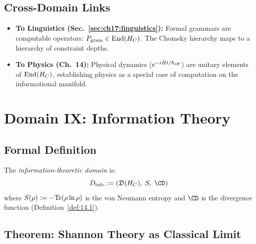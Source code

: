 \subsection{Cross-Domain Links}

\begin{itemize}
  \item \textbf{To Linguistics (Sec.~\ref{sec:ch17:linguistics}):}
        Formal grammars are computable operators:
        $P_{\mathrm{gram}} \in \mathrm{End}(H_C)$.  The Chomsky
        hierarchy maps to a hierarchy of constraint depths.
  \item \textbf{To Physics (Ch.~14):} Physical dynamics
        ($e^{-i\hat{H} t/\hbar_{\mathrm{eff}}}$) are unitary elements of
        $\mathrm{End}(H_C)$, establishing physics as a special case
        of computation on the informational manifold.
\end{itemize}

\section{Domain IX: Information Theory}
\label{sec:ch17:info}

\subsection{Formal Definition}

\begin{definition}\label{def:17.8}
The \emph{information-theoretic domain} is:
\[
  D_{\mathrm{info}} := (\mathfrak{D}(\HC),\;
                        S,\;
                        \CD)
\]
where $S(\rho) := -\mathrm{Tr}(\rho \ln \rho)$ is the von Neumann entropy
and $\CD$ is the divergence function (Definition~\ref{def:14.1}).
\end{definition}

\subsection{Theorem: Shannon Theory as Classical Limit}

